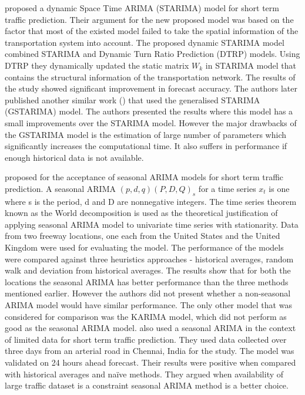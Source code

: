 \citet{min2009short} proposed a dynamic Space Time ARIMA (STARIMA) model for short term traffic
prediction. Their argument for the new proposed model was based on the factor that most of the
existed model failed to take the spatial information of the transportation system into account.
The proposed dynamic STARIMA model combined STARIMA and Dynamic Turn Ratio Prediction (DTRP)
models. Using DTRP they dynamically updated the static matrix $W_{k}$ in STARIMA model that contains
the structural information of the transportation network. The results of the study showed
significant improvement in forecast accuracy. The authors later published another similar work
(\citet{min2010urban}) that used the generalised STARIMA (GSTARIMA) model.  The authors
presented the results where this model has a small improvements over the STARIMA model. However
the major drawbacks of the GSTARIMA model is the estimation of large number of parameters which
significantly increases the computational time. It also suffers in performance if enough historical
data is not available.

\citet{williams2003modeling} proposed for the acceptance of seasonal ARIMA models for short term
traffic prediction. A seasonal ARIMA $(p,d,q) (P,D,Q)_{s}$ for a time series {$x_{t}$} is one
where s is the period, d and D are nonnegative integers. The time series theorem known as the World
decomposition is used as the theoretical justification of applying seasonal ARIMA model to
univariate time series with stationarity. Data from two freeway locations, one each from the
United States and the United Kingdom were used for evaluating the model. The performance of the
models were compared against three heuristics approaches - historical averages, random walk and
deviation from historical averages. The results show that for both the locations the seasonal
ARIMA has better performance than the three methods mentioned earlier. However the authors did
not present whether a non-seasonal ARIMA model would have similar performance. The only other
model that was considered for comparison was the KARIMA model, which did not perform as good as
the seasonal ARIMA model. \citet{kumar2015short} also used a seasonal ARIMA in the context of
limited data for short term traffic prediction. They used data collected over three days from an
arterial road in Chennai, India for the study. The model was validated on 24 hours ahead forecast.
Their results were positive when compared with historical averages and naïve methods. They
argued when availability of large traffic dataset is a constraint seasonal ARIMA method is a
better choice.

